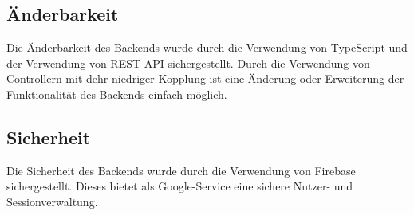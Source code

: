 \documentclass{qualitätssicherungsheft}
\begin{document}
\subsection{Änderbarkeit}
Die Änderbarkeit des Backends wurde durch die Verwendung von TypeScript und der Verwendung von REST-API sichergestellt.
Durch die Verwendung von Controllern mit dehr niedriger Kopplung ist eine Änderung oder Erweiterung der Funktionalität des Backends einfach möglich.

\subsection{Sicherheit}
Die Sicherheit des Backends wurde durch die Verwendung von Firebase sichergestellt. 
Dieses bietet als Google-Service eine sichere Nutzer- und Sessionverwaltung.
\end{document}
